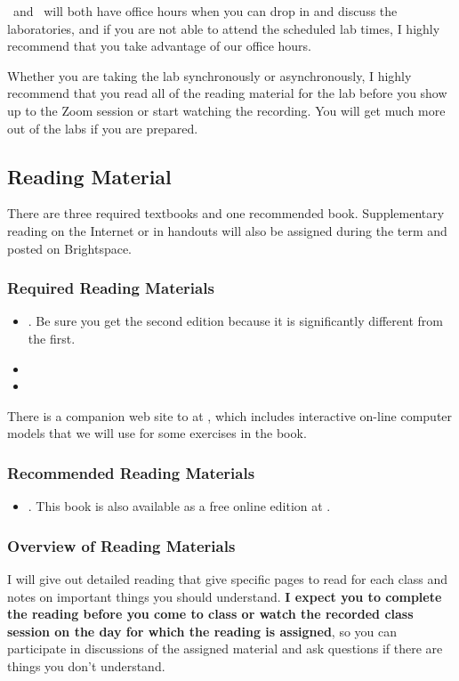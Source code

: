 \documentclass[11pt,twoside]{jgsyllabus}\usepackage[]{graphicx}\usepackage[]{color}
\begin{document}
\TaTitle\ and \ProfTitle\ will both have office hours
when you can drop in and discuss the laboratories, and if you are not able to
attend the scheduled lab times, I highly  recommend that you take advantage of
our office hours.

Whether you are taking the lab synchronously or asynchronously, I highly
recommend that you read all of the reading material for the lab before you
show up to the Zoom session or start watching the recording. You will get much
more out of the labs if you are prepared.

\subsection{Reading Material}
There are three required textbooks and one recommended book.
Supplementary reading on the Internet or in handouts will also be assigned
during the term and posted on Brightspace.

\subsubsection[Required Reading]{Required Reading Materials}
\begin{itemize}
	\item \LongArcher. Be sure you get the second edition because it is
	      significantly different from the first.
	\item \LongNordhaus
	\item \LongPielke
\end{itemize}
There is a companion web site to \emph{\Archer\/} at \ArcherURL, which includes
interactive on-line computer models that we will use for some exercises in the
book.

\subsubsection[Recommended Reading]{Recommended Reading Materials}
\begin{itemize}
  \item \LongWickham. This book is also available as a free online edition at
    \WickhamURL.
\end{itemize}

\subsubsection{Overview of Reading Materials}
I will give out detailed reading that give specific pages to read for each
class and notes on important things you should understand.
\textbf{I expect you to complete the reading before you come to class or watch
  the recorded class session on the day for which the reading is assigned},
so you can participate in discussions of the assigned material and ask
questions if there are things you don't understand.  %
\end{document}

